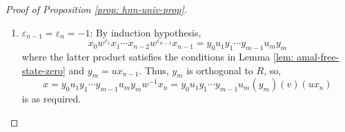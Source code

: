 \documentclass[10pt,a4paper]{amsart}
\begin{document}
\begin{proof}[Proof of Proposition \ref{prop: hnn-univ-prop}]
\begin{enumerate}
\begin{equation*}
        \end{equation*}
        is as required.
        \item $\varepsilon_{n-1} = \varepsilon_n = -1$: By induction hypothesis,
        \begin{equation*}
            x_0w^{\varepsilon_1}x_1\cdots x_{n-2}w^{\varepsilon_{n-1}}x_{n-1} = y_0u_1y_1 \cdots y_{m-1}u_my_m
        \end{equation*}
        where the latter product satisfies the conditions in Lemma \ref{lem: amal-free-state-zero} and $y_m = ux_{n-1}$. Thus, $y_m$ is orthogonal to $R$, so,
        \begin{equation*}
            x = y_0u_1y_1 \cdots y_{m-1}u_my_mw^{-1}x_n = y_0u_1y_1 \cdots y_{m-1}u_m(y_m)(v)(ux_n)
        \end{equation*}
        is as required.
    \end{enumerate}
\end{proof}
\end{document}
